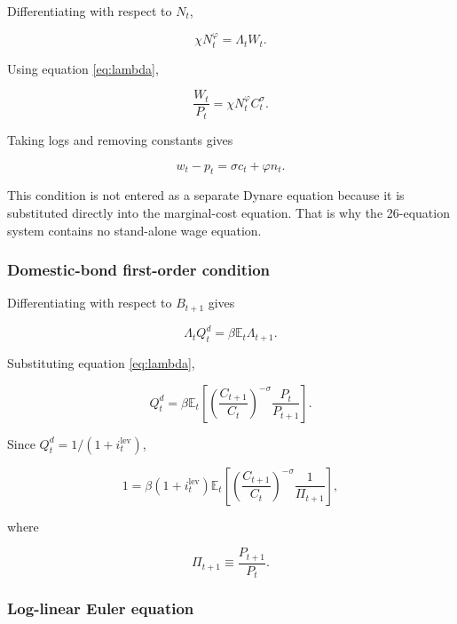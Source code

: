 Differentiating with respect to \(N_t\),

\begin{equation}
\chi N_t^{\varphi}
=
\Lambda_tW_t.
\end{equation}

Using equation \eqref{eq:lambda},

\begin{equation}
\frac{W_t}{P_t}
=
\chi N_t^\varphi C_t^\sigma.
\label{eq:labor_supply_level}
\end{equation}

Taking logs and removing constants gives

\begin{equation}
\boxed{
w_t-p_t
=
\sigma c_t+\varphi n_t.
}
\label{eq:labor_supply_linear}
\end{equation}

This condition is not entered as a separate Dynare equation because it is
substituted directly into the marginal-cost equation. That is why the
26-equation system contains no stand-alone wage equation.

\subsubsection{Domestic-bond first-order condition}

Differentiating with respect to \(B_{t+1}\) gives

\begin{equation}
\Lambda_tQ_t^d
=
\beta\mathbb E_t\Lambda_{t+1}.
\end{equation}

Substituting equation \eqref{eq:lambda},

\begin{equation}
Q_t^d
=
\beta
\mathbb E_t
\left[
\left(\frac{C_{t+1}}{C_t}\right)^{-\sigma}
\frac{P_t}{P_{t+1}}
\right].
\label{eq:bond_euler_price}
\end{equation}

Since \(Q_t^d=1/(1+i_t^{\mathrm{lev}})\),

\begin{equation}
1
=
\beta(1+i_t^{\mathrm{lev}})
\mathbb E_t
\left[
\left(\frac{C_{t+1}}{C_t}\right)^{-\sigma}
\frac{1}{\Pi_{t+1}}
\right],
\label{eq:euler_exact}
\end{equation}

where

\[
\Pi_{t+1}\equiv\frac{P_{t+1}}{P_t}.
\]

\subsubsection{Log-linear Euler equation}

